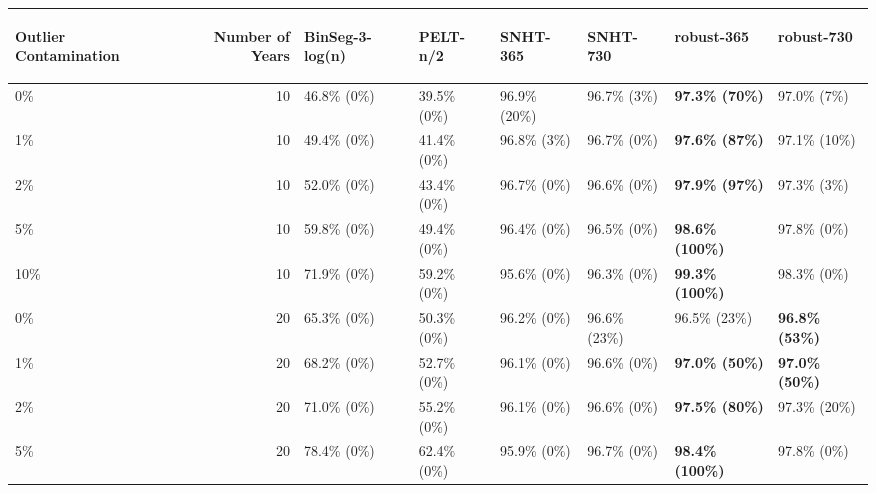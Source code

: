 \begin{table}[ht]
\centering
\begin{tabular}{lrllllll}
  \hline
\begin{sideways} Outlier Contamination \end{sideways} & \begin{sideways} Number of Years \end{sideways} & \begin{sideways} BinSeg-3-log(n) \end{sideways} & \begin{sideways} PELT-n/2 \end{sideways} & \begin{sideways} SNHT-365 \end{sideways} & \begin{sideways} SNHT-730 \end{sideways} & \begin{sideways} robust-365 \end{sideways} & \begin{sideways} robust-730 \end{sideways} \\ 
  \hline
0\% &  10 & 46.8\% (0\%) & 39.5\% (0\%) & 96.9\% (20\%) & 96.7\% (3\%) & \textbf{97.3\% (70\%)} & 97.0\% (7\%) \\ 
  1\% &  10 & 49.4\% (0\%) & 41.4\% (0\%) & 96.8\% (3\%) & 96.7\% (0\%) & \textbf{97.6\% (87\%)} & 97.1\% (10\%) \\ 
  2\% &  10 & 52.0\% (0\%) & 43.4\% (0\%) & 96.7\% (0\%) & 96.6\% (0\%) & \textbf{97.9\% (97\%)} & 97.3\% (3\%) \\ 
  5\% &  10 & 59.8\% (0\%) & 49.4\% (0\%) & 96.4\% (0\%) & 96.5\% (0\%) & \textbf{98.6\% (100\%)} & 97.8\% (0\%) \\ 
  10\% &  10 & 71.9\% (0\%) & 59.2\% (0\%) & 95.6\% (0\%) & 96.3\% (0\%) & \textbf{99.3\% (100\%)} & 98.3\% (0\%) \\ 
  0\% &  20 & 65.3\% (0\%) & 50.3\% (0\%) & 96.2\% (0\%) & 96.6\% (23\%) & 96.5\% (23\%) & \textbf{96.8\% (53\%)} \\ 
  1\% &  20 & 68.2\% (0\%) & 52.7\% (0\%) & 96.1\% (0\%) & 96.6\% (0\%) & \textbf{97.0\% (50\%)} & \textbf{97.0\% (50\%)} \\ 
  2\% &  20 & 71.0\% (0\%) & 55.2\% (0\%) & 96.1\% (0\%) & 96.6\% (0\%) & \textbf{97.5\% (80\%)} & 97.3\% (20\%) \\ 
  5\% &  20 & 78.4\% (0\%) & 62.4\% (0\%) & 95.9\% (0\%) & 96.7\% (0\%) & \textbf{98.4\% (100\%)} & 97.8\% (0\%) \\ 

\end{tabular}
\end{table}
